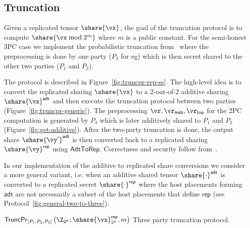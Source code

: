 \subsection{Truncation}
\label{subsec:truncation}

Given a replicated tensor $\share{\vx}$, the goal of the truncation protocol is
to compute $\share{\vx \bmod 2^m}$ where $m$ is a public constant.
For the semi-honest 3PC case we implement the probabilistic
truncation from~\cite{PoPETS:DalEscKel20} where the preprocessing is done by one party ($P_3$ for eg)
which is then secret shared to the other two parties ($P_1$ and $P_2$).

The protocol is described in Figure~\ref{fig:truncpr-rep-ss}. The high-level
idea is to convert the replicated sharing $\share{\vx}$ to a $2$-out-of-$2$
additive sharing $\share{\vx}^{\mathsf{adt}}$ and then execute the truncation
protocol between two parties (Figure~\ref{fig:truncpr-generic}). The
preprocessing $\vr, \vr_\mathsf{msb}, \vr_\mathsf{top}$ for the 2PC computation
is generated by $P_3$ which is later additively shared to $P_1$ and $P_2$
(Figure~\ref{fig:get-additive}). After the two-party truncation is done, the
output share $\share{\vy'}^{\mathsf{adt}}$ is then converted back to a
replicated sharing $\share{\vy}^{\mathsf{rep}}$ using $\mathsf{AdtToRep}$.
Correctness and security follow from~\cite{PoPETS:DalEscKel20}.

In our implementation of the additive to replicated share conversions
we consider a more general variant, i.e. when an additive shared tensor
$\share{\cdot}^\mathsf{adt}$ is converted to a replicated secret
$\share{\cdot}^\mathsf{rep}$
where the host placements forming
$\mathsf{adt}$ are not necessarily a subset of the host placements
that define $\mathsf{rep}$ (see Protocol~\ref{fig:general-two-to-three}).


\msubsubsection
  {$\mathsf{TruncPr}_{[P_1, P_2, P_3]} \left(\Z_{2^k}; \share{\vx}^{\mathsf{rep}}_{2^k}, m \right)$}
  \label{fig:truncpr-rep-ss}
  Three party truncation protocol.

